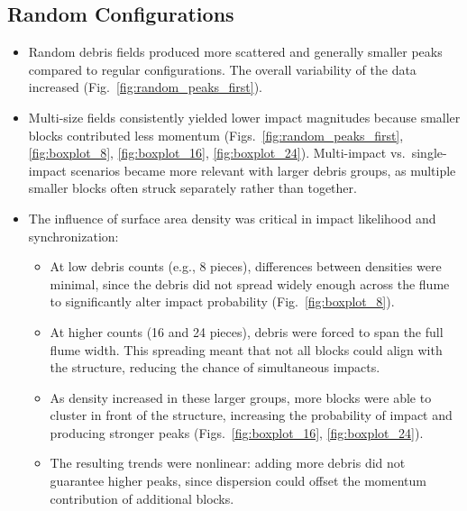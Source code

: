 \documentclass{article}
\begin{document}
\subsection{Random Configurations}
\begin{itemize}
    \item Random debris fields produced more scattered and generally smaller peaks compared to regular configurations. The overall variability of the data increased (Fig.~\ref{fig:random_peaks_first}). 
    \item Multi-size fields consistently yielded lower impact magnitudes because smaller blocks contributed less momentum (Figs.~\ref{fig:random_peaks_first}, \ref{fig:boxplot_8}, \ref{fig:boxplot_16}, \ref{fig:boxplot_24}). Multi-impact vs.\ single-impact scenarios became more relevant with larger debris groups, as multiple smaller blocks often struck separately rather than together.
    \item The influence of surface area density was critical in impact likelihood and synchronization:
    \begin{itemize}
        \item At low debris counts (e.g., 8 pieces), differences between densities were minimal, since the debris did not spread widely enough across the flume to significantly alter impact probability (Fig.~\ref{fig:boxplot_8}).
        \item At higher counts (16 and 24 pieces), debris were forced to span the full flume width. This spreading meant that not all blocks could align with the structure, reducing the chance of simultaneous impacts.
        \item As density increased in these larger groups, more blocks were able to cluster in front of the structure, increasing the probability of impact and producing stronger peaks (Figs.~\ref{fig:boxplot_16}, \ref{fig:boxplot_24}).
        \item The resulting trends were nonlinear: adding more debris did not guarantee higher peaks, since dispersion could offset the momentum contribution of additional blocks.
    \end{itemize}
\end{itemize}
\end{document}
